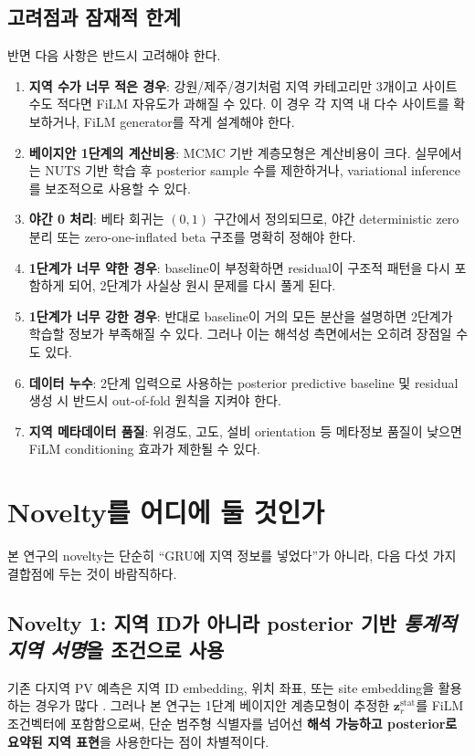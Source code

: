 \documentclass[11pt,a4paper]{article}
\begin{document}
\subsection{고려점과 잠재적 한계}
반면 다음 사항은 반드시 고려해야 한다.
\begin{enumerate}[label=(\alph*)]
    \item \textbf{지역 수가 너무 적은 경우}: 강원/제주/경기처럼 지역 카테고리만 3개이고 사이트 수도 적다면 FiLM 자유도가 과해질 수 있다. 이 경우 각 지역 내 다수 사이트를 확보하거나, FiLM generator를 작게 설계해야 한다.
    \item \textbf{베이지안 1단계의 계산비용}: MCMC 기반 계층모형은 계산비용이 크다. 실무에서는 NUTS 기반 학습 후 posterior sample 수를 제한하거나, variational inference를 보조적으로 사용할 수 있다.
    \item \textbf{야간 0 처리}: 베타 회귀는 $(0,1)$ 구간에서 정의되므로, 야간 deterministic zero 분리 또는 zero-one-inflated beta 구조를 명확히 정해야 한다.
    \item \textbf{1단계가 너무 약한 경우}: baseline이 부정확하면 residual이 구조적 패턴을 다시 포함하게 되어, 2단계가 사실상 원시 문제를 다시 풀게 된다.
    \item \textbf{1단계가 너무 강한 경우}: 반대로 baseline이 거의 모든 분산을 설명하면 2단계가 학습할 정보가 부족해질 수 있다. 그러나 이는 해석성 측면에서는 오히려 장점일 수도 있다.
    \item \textbf{데이터 누수}: 2단계 입력으로 사용하는 posterior predictive baseline 및 residual 생성 시 반드시 out-of-fold 원칙을 지켜야 한다.
    \item \textbf{지역 메타데이터 품질}: 위경도, 고도, 설비 orientation 등 메타정보 품질이 낮으면 FiLM conditioning 효과가 제한될 수 있다.
\end{enumerate}

\section{Novelty를 어디에 둘 것인가}
본 연구의 novelty는 단순히 ``GRU에 지역 정보를 넣었다''가 아니라, 다음 다섯 가지 결합점에 두는 것이 바람직하다.

\subsection{Novelty 1: 지역 ID가 아니라 posterior 기반 \emph{통계적 지역 서명}을 조건으로 사용}
기존 다지역 PV 예측은 지역 ID embedding, 위치 좌표, 또는 site embedding을 활용하는 경우가 많다 \citep{Goutte2024Embedding,Wen2024DecoderGeo}. 그러나 본 연구는 1단계 베이지안 계층모형이 추정한 $\bm z_r^{\mathrm{stat}}$를 FiLM 조건벡터에 포함함으로써, 단순 범주형 식별자를 넘어선 \textbf{해석 가능하고 posterior로 요약된 지역 표현}을 사용한다는 점이 차별적이다.
\end{document}
